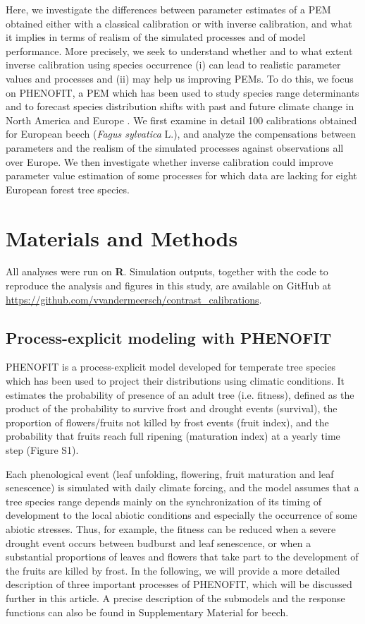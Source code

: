 \documentclass[preprint,12pt,authoryear]{elsarticle}
\begin{document}
Here, we investigate the differences between parameter estimates of a PEM obtained either with a classical calibration or with inverse calibration, and what it implies in terms of realism of the simulated processes and of model performance. More precisely, we seek to understand whether and to what extent inverse calibration using species occurrence (i) can lead to realistic parameter values and processes and (ii) may help us improving PEMs. To do this, we focus on PHENOFIT, a PEM which has been used to study species range determinants and to forecast species distribution shifts with past and future climate change in North America and Europe
\citep{Morin2007, Saltre2013, Saltre2015, Cheaib2012}. We first examine in detail 100 calibrations obtained for European beech (\emph{Fagus sylvatica} L.), and analyze the compensations between parameters and the realism of the simulated processes against observations all over Europe. We then investigate whether inverse calibration could improve parameter value estimation of some processes for which data are lacking for eight European forest tree species. 

\section{Materials and Methods}

\textcolor{customred}{All analyses were run on \textbf{\textsf{R}}. Simulation outputs, together with the code to reproduce the analysis and figures in this study, are available on GitHub at \url{https://github.com/vvandermeersch/contrast_calibrations}.}

\subsection{Process-explicit modeling with PHENOFIT}

PHENOFIT is a process-explicit model developed for temperate tree species which has been used to project their distributions using climatic conditions. It estimates the probability of presence of an adult tree (i.e. fitness), defined as the product of the probability to survive frost and drought events (survival), the proportion of flowers/fruits not killed by frost events (fruit index), and the probability that fruits reach full ripening (maturation index) at a yearly time step (Figure S1).

Each phenological event (leaf unfolding, flowering, fruit maturation and leaf senescence) is simulated with daily climate forcing, and the model assumes that a tree species range depends mainly on the synchronization of its timing of development to the local abiotic conditions and especially the occurrence of some abiotic stresses. Thus, for example, the fitness can be reduced when a severe drought event occurs between budburst and leaf senescence, or when a substantial proportions of leaves and flowers that take part to the development of the fruits are killed by frost. In the following, we will provide a more detailed description of three important processes of PHENOFIT, which will be discussed further in this article. A precise description of the submodels and the response functions can also be found in Supplementary Material for beech.
\end{document}

